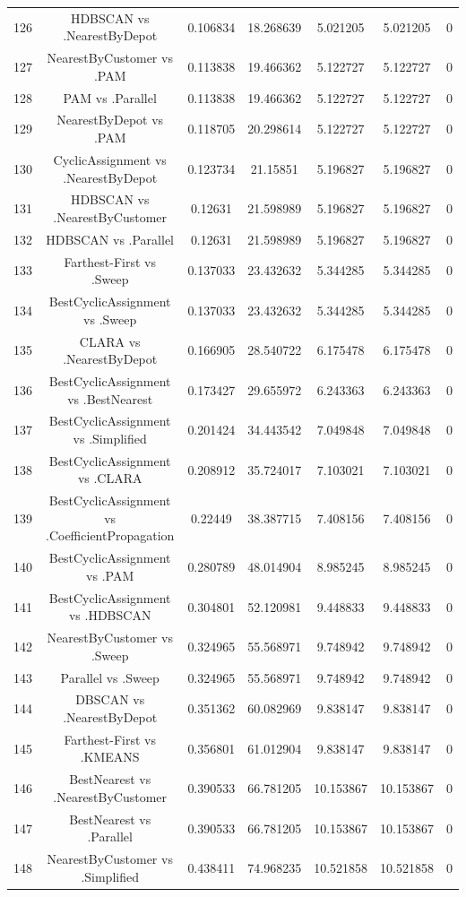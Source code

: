 \documentclass[a4paper,10pt]{article}
\begin{document}
\begin{landscape}
\begin{table}[!htp]
\begin{tabular}{ccccccc}
126&HDBSCAN vs .NearestByDepot&0.106834&18.268639&5.021205&5.021205&0\\
127&NearestByCustomer vs .PAM&0.113838&19.466362&5.122727&5.122727&0\\
128&PAM vs .Parallel&0.113838&19.466362&5.122727&5.122727&0\\
129&NearestByDepot vs .PAM&0.118705&20.298614&5.122727&5.122727&0\\
130&CyclicAssignment vs .NearestByDepot&0.123734&21.15851&5.196827&5.196827&0\\
131&HDBSCAN vs .NearestByCustomer&0.12631&21.598989&5.196827&5.196827&0\\
132&HDBSCAN vs .Parallel&0.12631&21.598989&5.196827&5.196827&0\\
133&Farthest-First vs .Sweep&0.137033&23.432632&5.344285&5.344285&0\\
134&BestCyclicAssignment vs .Sweep&0.137033&23.432632&5.344285&5.344285&0\\
135&CLARA vs .NearestByDepot&0.166905&28.540722&6.175478&6.175478&0\\
136&BestCyclicAssignment vs .BestNearest&0.173427&29.655972&6.243363&6.243363&0\\
137&BestCyclicAssignment vs .Simplified&0.201424&34.443542&7.049848&7.049848&0\\
138&BestCyclicAssignment vs .CLARA&0.208912&35.724017&7.103021&7.103021&0\\
139&BestCyclicAssignment vs .CoefficientPropagation&0.22449&38.387715&7.408156&7.408156&0\\
140&BestCyclicAssignment vs .PAM&0.280789&48.014904&8.985245&8.985245&0\\
141&BestCyclicAssignment vs .HDBSCAN&0.304801&52.120981&9.448833&9.448833&0\\
142&NearestByCustomer vs .Sweep&0.324965&55.568971&9.748942&9.748942&0\\
143&Parallel vs .Sweep&0.324965&55.568971&9.748942&9.748942&0\\
144&DBSCAN vs .NearestByDepot&0.351362&60.082969&9.838147&9.838147&0\\
145&Farthest-First vs .KMEANS&0.356801&61.012904&9.838147&9.838147&0\\
146&BestNearest vs .NearestByCustomer&0.390533&66.781205&10.153867&10.153867&0\\
147&BestNearest vs .Parallel&0.390533&66.781205&10.153867&10.153867&0\\
148&NearestByCustomer vs .Simplified&0.438411&74.968235&10.521858&10.521858&0\\

\end{tabular}
\end{table}
\end{landscape}
\end{document}
